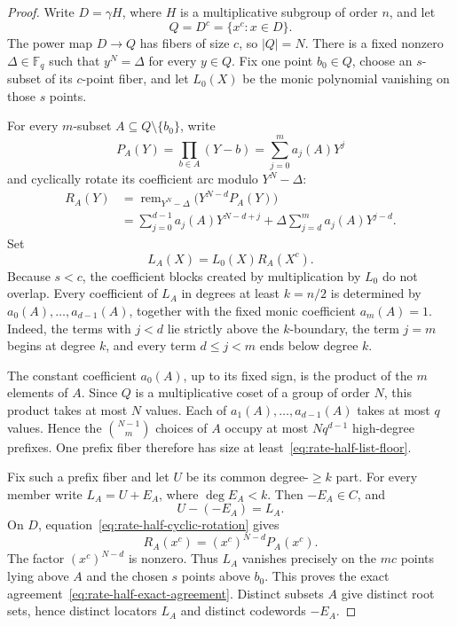 \documentclass[11pt]{article}
\newcommand{\F}{\mathbb F}
\begin{document}
\begin{proof}
Write \(D=\gamma H\), where \(H\) is a multiplicative subgroup of order
\(n\), and let
\[
  Q=D^c=\{x^c:x\in D\}.
\]
The power map \(D\to Q\) has fibers of size \(c\), so \(|Q|=N\).  There is a
fixed nonzero \(\Delta\in\F_q\) such that \(y^N=\Delta\) for every \(y\in Q\).
Fix one point \(b_0\in Q\), choose an \(s\)-subset of its \(c\)-point fiber,
and let \(L_0(X)\) be the monic polynomial vanishing on those \(s\) points.

For every \(m\)-subset \(A\subseteq Q\setminus\{b_0\}\), write
\[
  P_A(Y)=\prod_{b\in A}(Y-b)
        =\sum_{j=0}^{m}a_j(A)Y^j
\]
and cyclically rotate its coefficient arc modulo \(Y^N-\Delta\):
\begin{equation}
\label{eq:rate-half-cyclic-rotation}
\begin{split}
  R_A(Y)
  &=
  \operatorname{rem}_{Y^N-\Delta}
    \bigl(Y^{N-d}P_A(Y)\bigr)\\
  &=
  \sum_{j=0}^{d-1}a_j(A)Y^{N-d+j}
  +\Delta\sum_{j=d}^{m}a_j(A)Y^{j-d}.
\end{split}
\end{equation}
Set
\[
  L_A(X)=L_0(X)R_A(X^c).
\]
Because \(s<c\), the coefficient blocks created by multiplication by \(L_0\)
do not overlap.  Every coefficient of \(L_A\) in degrees at least
\(k=n/2\) is determined by \(a_0(A),\ldots,a_{d-1}(A)\), together with the
fixed monic coefficient \(a_m(A)=1\).  Indeed, the terms with \(j<d\) lie
strictly above the \(k\)-boundary, the term \(j=m\) begins at degree \(k\),
and every term \(d\le j<m\) ends below degree \(k\).

The constant coefficient \(a_0(A)\), up to its fixed sign, is the product of
the \(m\) elements of \(A\).  Since \(Q\) is a multiplicative coset of a
group of order \(N\), this product takes at most \(N\) values.  Each of
\(a_1(A),\ldots,a_{d-1}(A)\) takes at most \(q\) values.  Hence the
\(\binom{N-1}{m}\) choices of \(A\) occupy at most \(Nq^{d-1}\) high-degree
prefixes.  One prefix fiber therefore has size at
least~\eqref{eq:rate-half-list-floor}.

Fix such a prefix fiber and let \(U\) be its common degree-\(\ge k\) part.
For every member write \(L_A=U+E_A\), where \(\deg E_A<k\).  Then
\(-E_A\in C\), and
\[
  U-(-E_A)=L_A.
\]
On \(D\), equation~\eqref{eq:rate-half-cyclic-rotation} gives
\[
  R_A(x^c)=(x^c)^{N-d}P_A(x^c).
\]
The factor \((x^c)^{N-d}\) is nonzero.  Thus \(L_A\) vanishes precisely on
the \(mc\) points lying above \(A\) and the chosen \(s\) points above
\(b_0\).  This proves the exact
agreement~\eqref{eq:rate-half-exact-agreement}.  Distinct subsets \(A\)
give distinct root sets, hence distinct locators \(L_A\) and distinct
codewords \(-E_A\).
\end{proof}
\end{document}
